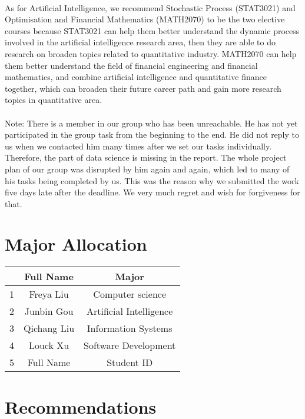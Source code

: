 \documentclass{article}
\begin{document}
	\\
	As for Artificial Intelligence, we recommend Stochastic Process (STAT3021) and Optimisation and Financial Mathematics (MATH2070) to be the two elective courses because STAT3021 can help them better understand the dynamic process involved in the artificial intelligence research area, then they are able to do research on broaden topics related to quantitative industry. MATH2070 can help them better understand the field of financial engineering and financial mathematics, and combine artificial intelligence and quantitative finance together, which can broaden their future career path and gain more research topics in quantitative area.\\
	\\
	Note: There is a member in our group who has been unreachable. He has not yet participated in the group task from the beginning to the end. He did not reply to us when we contacted him many times after we set our tasks individually. Therefore, the part of data science is missing in the report. The whole project plan of our group was disrupted by him again and again, which led to many of his tasks being completed by us. This was the reason why we submitted the work five days late after the deadline. We very much regret and wish for forgiveness for that.
	
	\section{Major Allocation}
	\begin{center}
		\begin{larger}
			\begin{tabular}{|c|c|c|}
				\hline &Full Name& Major\\
				\hline 1& Freya Liu & Computer science  \\
				\hline 2& Junbin Gou & Artificial Intelligence  \\
				\hline 3& Qichang Liu& Information Systems  \\
				\hline 4& Louck Xu & Software Development  \\
				\hline 5&Full Name& Student ID  \\
				\hline
			\end{tabular}
		\end{larger}
	\end{center}
	
	\section{Recommendations}
\end{document}

